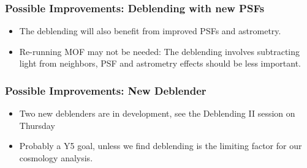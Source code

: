 \documentclass{beamer}
\begin{document}
\frame
{
    \frametitle{Possible Improvements: Deblending with new PSFs}

    \begin{itemize}

        \item The deblending will also benefit from improved
            PSFs and astrometry.

        \item Re-running MOF may not be needed: The deblending involves
            subtracting light from neighbors, PSF and astrometry effects should
            be less important.

    \end{itemize}

}

\frame
{
    \frametitle{Possible Improvements: New Deblender}

    \begin{itemize}

        \item Two new deblenders are in development, see 
            the Deblending II session on Thursday

        \item Probably a Y5 goal, unless we find deblending is
            the limiting factor for our cosmology analysis.

    \end{itemize}

}
\end{document}
